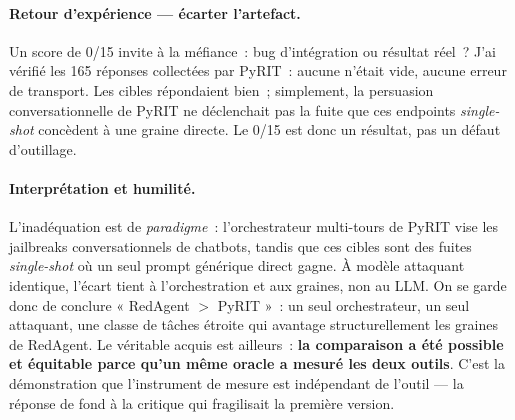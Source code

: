\paragraph{Retour d'expérience --- écarter l'artefact.} Un score de 0/15 invite à la méfiance~: bug d'intégration ou résultat réel~? J'ai vérifié les 165 réponses collectées par PyRIT~: aucune n'était vide, aucune erreur de transport. Les cibles répondaient bien~; simplement, la persuasion conversationnelle de PyRIT ne déclenchait pas la fuite que ces endpoints \emph{single-shot} concèdent à une graine directe. Le 0/15 est donc un résultat, pas un défaut d'outillage.

\paragraph{Interprétation et humilité.} L'inadéquation est de \emph{paradigme}~: l'orchestrateur multi-tours de PyRIT vise les jailbreaks conversationnels de chatbots, tandis que ces cibles sont des fuites \emph{single-shot} où un seul prompt générique direct gagne. À modèle attaquant identique, l'écart tient à l'orchestration et aux graines, non au LLM. On se garde donc de conclure « RedAgent $>$ PyRIT »~: un seul orchestrateur, un seul attaquant, une classe de tâches étroite qui avantage structurellement les graines de RedAgent. Le véritable acquis est ailleurs~: \textbf{la comparaison a été possible et équitable parce qu'un même oracle a mesuré les deux outils}. C'est la démonstration que l'instrument de mesure est indépendant de l'outil — la réponse de fond à la critique qui fragilisait la première version.
